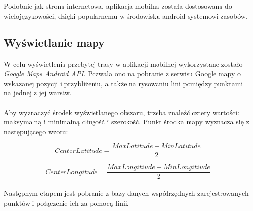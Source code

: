 Podobnie jak strona internetowa, aplikacja mobilna została dostosowana do wielojęzykowości, dzięki popularnemu w środowisku android systemowi zasobów.

\subsection{Wyświetlanie mapy} %
\label{sub:wy_wietlanie_mapy}
\paragraph{} %


W celu wyświetlenia przebytej trasy w aplikacji mobilnej wykorzystane zostało \textit{Google Maps Android API}. Pozwala ono na pobranie z serwisu Google mapy o wskazanej pozycji i przybliżeniu, a także na rysowaniu lini pomiędzy punktami na jednej z jej warstw. 

\paragraph{}
Aby wyznaczyć środek wyświetlanego obszaru, trzeba znaleźć cztery wartości: maksymalną i minimalną długość i szerokość. Punkt środka mapy wyznacza się z następującego wzoru:

\begin{equation}
	CenterLatitude = \frac{MaxLatitude + MinLatitude}{2}
\end{equation}

\begin{equation}
		CenterLongitude = \frac{MaxLongitiude + MinLongitiude}{2}
\end{equation}

\paragraph{} %
\label{par:}
Następnym etapem jest pobranie z bazy danych współrzędnych zarejestrowanych punktów i połączenie ich za pomocą linii.



